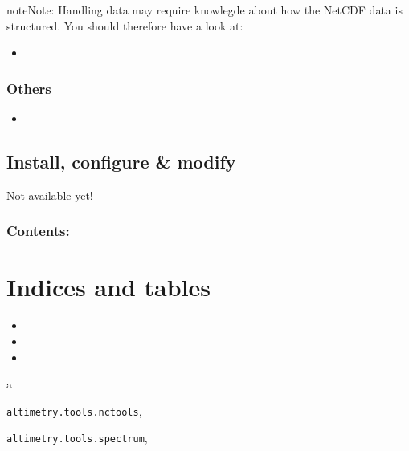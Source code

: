 \documentclass[letterpaper,10pt,english]{sphinxmanual}
\begin{document}
\begin{notice}{note}{Note:}
Handling data may require knowlegde about how the NetCDF data is structured. You should therefore have a look at:
\begin{itemize}
\item {} 
{\hyperref[altimetry.data:structures]{\emph{}}}

\end{itemize}
\end{notice}


\subsection{Others}
\label{Examples:id1}\label{Examples:others}\begin{itemize}
\item {} 
{\hyperref[altimetry.tools.spectrum:spectral-tools]{\emph{}}}

\end{itemize}


\section{Install, configure \& modify}
\label{Install:install-configure-modify}\label{Install::doc}
Not available yet!


\subsection{Contents:}
\label{Install:contents}

\chapter{Indices and tables}
\label{index:indices-and-tables}\begin{itemize}
\item {} 

\item {} 

\item {} 

\end{itemize}


\renewcommand{\indexname}{Python Module Index}
\begin{theindex}
\def\bigletter#1{{\Large\sffamily#1}\nopagebreak\vspace{1mm}}
\bigletter{a}
\item {\texttt{altimetry.tools.nctools}}, \pageref{altimetry.tools.nctools:module-altimetry.tools.nctools}
\item {\texttt{altimetry.tools.spectrum}}, \pageref{altimetry.tools.spectrum:module-altimetry.tools.spectrum}
\end{theindex}

\renewcommand{\indexname}{Index}
\printindex
\end{document}
